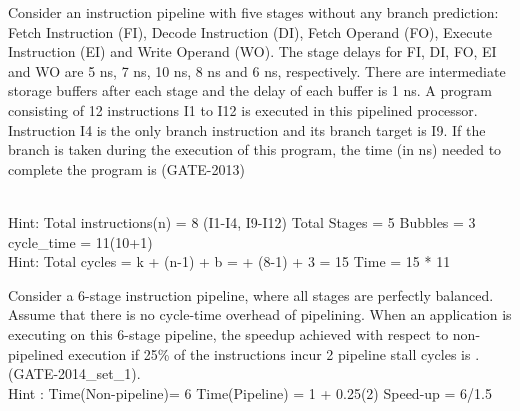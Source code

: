 \begin{questyle}
  \question  Consider an instruction pipeline with five stages without any branch prediction:
   Fetch Instruction (FI), Decode Instruction (DI), Fetch Operand (FO), Execute Instruction (EI) and
   Write Operand (WO). The stage delays for FI, DI, FO, EI and WO are 5 ns, 7 ns, 10 ns, 8 ns and 6 ns,
   respectively. There are intermediate storage buffers after each stage and the delay of each
   buffer is 1 ns. A program consisting of 12 instructions I1 to I12 is executed in this pipelined
   processor. Instruction I4 is the only branch instruction and its branch target is I9.
   If the branch is taken during the execution of this program, the time (in ns) needed
   to complete the program is  (GATE-2013)

  \begin{oneparchoices}
  \end{oneparchoices} \\
  Hint: Total instructions(n) = 8 (I1-I4, I9-I12) \quad Total Stages = 5 \quad Bubbles = 3 \quad cycle\_time = 11(10+1)\\
  Hint: Total cycles = k + (n-1) + b =  + (8-1) + 3 = 15 \quad Time = 15 * 11

\end{questyle}


\begin{questyle}
  \question  Consider a 6-stage instruction pipeline, where all stages are perfectly balanced.
            Assume that there is no cycle-time overhead of pipelining. When an application is executing
            on this 6-stage pipeline, the speedup achieved with respect to non-pipelined execution if 25\% of
            the instructions incur 2 pipeline stall cycles is \fillin[4]. (GATE-2014\_set\_1). \\
            Hint : Time(Non-pipeline)= 6 \quad Time(Pipeline) = 1 + 0.25(2) \quad Speed-up = 6/1.5
\end{questyle}


